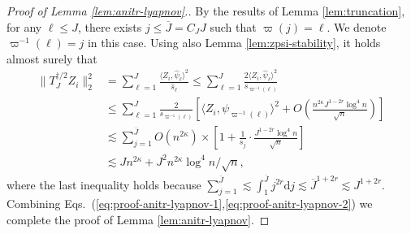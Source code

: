 \documentclass[11pt,a4paper]{article}
\renewcommand{\hat}{\widehat}
\renewcommand{\bar}{\overline}
\theoremstyle{definition}
\theoremstyle{plain}
\theoremstyle{remark}
\newcommand{\ud}{\mathrm d}
\begin{document}
\begin{proof}[Proof of Lemma \ref{lem:anitr-lyapnov}.]
By the results of Lemma \ref{lem:truncation}, for any $\ell\leq J$, there exists $j\leq \bar J=C_J J$ such that $\varpi(j)=\ell$. We denote $\varpi^{-1}(\ell)=j$ in this case. 
Using also Lemma \ref{lem:zpsi-stability}, it holds almost surely that
\begin{align}
\|T_J^{\dagger/2}Z_i\|_2^2  &= \sum_{\ell=1}^J\frac{\langle Z_i,\hat\psi_\ell\rangle^2}{\hat s_\ell}
\leq \sum_{\ell=1}^J\frac{2\langle Z_i,\hat\psi_\ell\rangle^2}{s_{\varpi^{-1}(\ell)}}\nonumber\\
&\leq \sum_{\ell=1}^J \frac{2}{s_{\varpi^{-1}(\ell)}}\left[\langle Z_i,\psi_{\varpi^{-1}(\ell)}\rangle^2 + O\left(\frac{n^{2\kappa}J^{1-2r}\log^4 n}{\sqrt{n}}\right)\right]\nonumber\\
&\lesssim \sum_{j=1}^{\bar J}O(n^{2\kappa})\times\left[1 + \frac{1}{s_j}\cdot \frac{J^{1-2r}\log^4 n}{\sqrt{n}}\right]\nonumber\\
&\lesssim Jn^{2\kappa} + J^2 n^{2\kappa}\log^4 n/\sqrt{n},\label{eq:proof-anitr-lyapnov-2}
\end{align}
where the last inequality holds because $\sum_{j=1}^{\bar J}\lesssim \int_1^{\bar J}j^{2r}\ud j \lesssim \bar J^{1+2r}\lesssim J^{1+2r}$.
Combining Eqs.~(\ref{eq:proof-anitr-lyapnov-1},\ref{eq:proof-anitr-lyapnov-2}) we complete the proof of Lemma \ref{lem:anitr-lyapnov}.

\end{proof}
\end{document}
